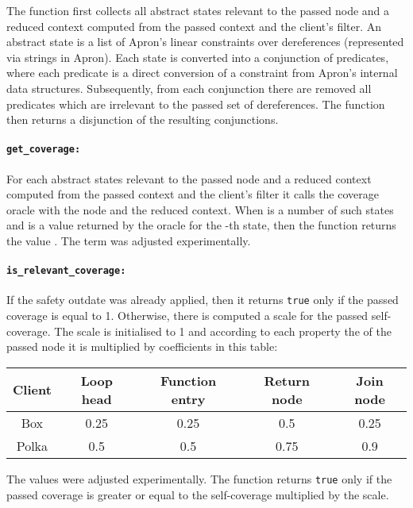 \documentclass[envcountsame]{llncs}
\begin{document}
The function first collects all abstract states relevant to the passed node and
a reduced context computed from the passed context and the client's filter. An
abstract state is a list of Apron's linear constraints over dereferences
(represented via strings in Apron). Each state is converted into a conjunction
of predicates, where each predicate is a direct conversion of a constraint from
Apron's internal data structures. Subsequently, from each conjunction there are
removed all predicates which are irrelevant to the passed set of dereferences.
The function then returns a disjunction of the resulting conjunctions.

\paragraph{\tt get\_coverage: }

For each abstract states relevant to the passed node and a reduced context
computed from the passed context and the client's filter it calls the coverage
oracle with the node and the reduced context. When  is a number of such
states and  is a value returned by the oracle for the -th state,
then the function returns the value .
The term was adjusted experimentally.

\paragraph{\tt is\_relevant\_coverage: }

If the safety outdate was already applied, then it returns \texttt{true} only if
the passed coverage is equal to 1. Otherwise, there is computed a scale for the
passed self-coverage.  The scale is initialised to 1 and according to each
property the of the passed node it is multiplied by coefficients in this table:

\hspace{5mm}
\begin{tabular}{c||c|c|c|c}
\textbf{Client} &
    \textbf{Loop head} &
    \textbf{Function entry} &
    \textbf{Return node} &
    \textbf{Join node}
    \\
\hline
Box & 0.25 & 0.25 & 0.5 & 0.25 \\
Polka & 0.5 & 0.5 & 0.75 & 0.9
\end{tabular}

\noindent The values were adjusted experimentally. The function returns
\texttt{true} only if the passed coverage is greater or equal to the
self-coverage multiplied by the scale.
\end{document}
